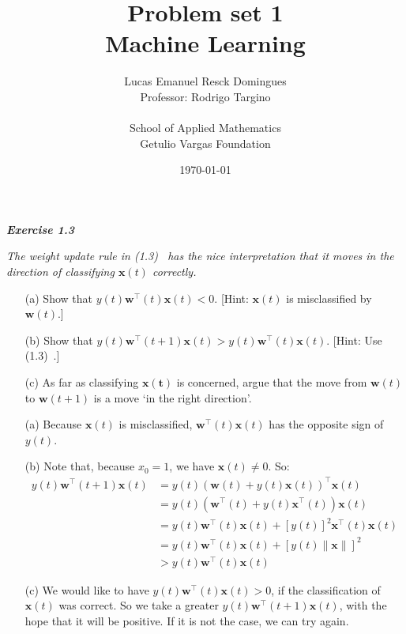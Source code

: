 \documentclass{article}
\title{Problem set 1\\
    \large{Machine Learning}}
\author{Lucas Emanuel Resck Domingues\\    
    Professor: Rodrigo Targino\\\\
    {School of Applied Mathematics}\\
    {Getulio Vargas Foundation}}
\date{\today}
\begin{document}
    \maketitle

    \noindent \textbf{\textit{Exercise 1.3}}

    \noindent \textit{The weight update rule in (1.3)~\cite{yaser2012learning} has the nice interpretation that it moves in the direction of classifying $\mathbf{x}(t)$ correctly.}
    \begin{itemize}[before=\itshape]
        \item[(a)] Show that $y(t) \mathbf{w}^\intercal(t) \mathbf{x}(t) < 0$. [Hint: $\mathbf{x}(t)$ is misclassified by $\mathbf{w}(t)$.]
        \item[(b)] Show that $y(t) \mathbf{w}^\intercal(t + 1) \mathbf{x}(t) > y(t) \mathbf{w}^\intercal(t) \mathbf{x}(t)$. [Hint: Use (1.3)~\cite{yaser2012learning}.]
        \item[(c)] As far as classifying $\mathbf{x(t)}$ is concerned, argue that the move from $\mathbf{w}(t)$ to $\mathbf{w}(t + 1)$ is a move `in the right direction'.
    \end{itemize}

    \begin{itemize}
        \item[(a)] Because $\mathbf{x}(t)$ is misclassified, $\mathbf{w}^\intercal(t) \mathbf{x}(t)$ has the opposite sign of $y(t)$.
        \item[(b)] Note that, because $x_0 = 1$, we have $\mathbf{x}(t) \ne 0$.
            So:
            \begin{align*}
                y(t) \mathbf{w}^\intercal(t + 1) \mathbf{x}(t) &= y(t) (\mathbf{w}(t) + y(t) \mathbf{x}(t))^\intercal \mathbf{x}(t) \\
                &= y(t) (\mathbf{w}^\intercal(t) + y(t) \mathbf{x}^\intercal(t)) \mathbf{x}(t) \\
                &= y(t) \mathbf{w}^\intercal(t) \mathbf{x}(t) + [y(t)]^2 \mathbf{x}^\intercal(t) \mathbf{x}(t)  \\
                &= y(t) \mathbf{w}^\intercal(t) \mathbf{x}(t) + [y(t) \lVert\mathbf{x}\lVert]^2 \\
                &> y(t) \mathbf{w}^\intercal(t) \mathbf{x}(t)
            \end{align*}
        \item[(c)] We would like to have $y(t) \mathbf{w}^\intercal(t) \mathbf{x}(t) > 0$, if the classification of $\mathbf{x}(t)$ was correct.
            So we take a greater $y(t) \mathbf{w}^\intercal(t + 1) \mathbf{x}(t)$, with the hope that it will be positive.
            If it is not the case, we can try again.
    \end{itemize}
\end{document}
